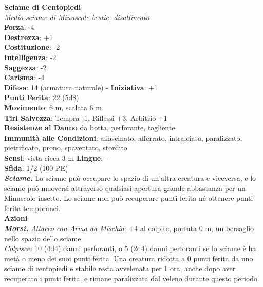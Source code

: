 \begin{multicols}{2}
\medskip\textbf{Sciame di Centopiedi}\\
\emph{Medio sciame di Minuscole bestie, disallineato}\\
\textbf{Forza}: -4\\
\textbf{Destrezza}: +1\\
\textbf{Costituzione}: -2\\
\textbf{Intelligenza}: -2\\
\textbf{Saggezza}: -2\\
\textbf{Carisma}: -4\\
\textbf{Difesa}: 14 (armatura naturale) - \textbf{Iniziativa}: +1\\
\textbf{Punti Ferita}: 22 (5d8)\\
\textbf{Movimento}: 6 m, scalata 6 m\\
\textbf{Tiri Salvezza}: Tempra -1, Riflessi +3, Arbitrio +1\\
\textbf{Resistenze al Danno} da botta, perforante, tagliente\\
\textbf{Immunità alle Condizioni}: affascinato, afferrato, intralciato, paralizzato, pietrificato, prono, spaventato, stordito\\
\textbf{Sensi}: vista cieca 3 m
\textbf{Lingue}: -\\
\textbf{Sfida}: 1/2 (100 PE)\smallskip\\
\emph{\textbf{Sciame.}} Lo sciame può occupare lo spazio di un'altra creatura e viceversa, e lo sciame può muoversi attraverso qualsiasi apertura grande abbastanza per un Minuscolo insetto. Lo sciame non può recuperare punti ferita né ottenere punti ferita temporanei.\\
\smallskip\textbf{Azioni}\\
\emph{\textbf{Morsi.} Attacco con Arma da Mischia}: +4 al colpire, portata 0 m, un bersaglio nello spazio dello sciame.\\
\emph{Colpisce:} 10 (4d4) danni perforanti, o 5 (2d4) danni perforanti se lo sciame è ha metà o meno dei suoi punti ferita. Una creatura ridotta a 0 punti ferita da uno sciame di centopiedi e stabile resta avvelenata per 1 ora, anche dopo aver recuperato i punti ferita, e rimane paralizzata dal veleno durante questo periodo.\\


\end{multicols}
